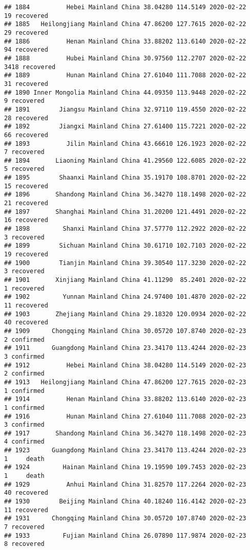 \documentclass[
]{article}
\begin{document}
\begin{verbatim}
## 1884          Hebei Mainland China 38.04280 114.5149 2020-02-22    19 recovered
## 1885   Heilongjiang Mainland China 47.86200 127.7615 2020-02-22    29 recovered
## 1886          Henan Mainland China 33.88202 113.6140 2020-02-22    94 recovered
## 1888          Hubei Mainland China 30.97560 112.2707 2020-02-22  3418 recovered
## 1889          Hunan Mainland China 27.61040 111.7088 2020-02-22    31 recovered
## 1890 Inner Mongolia Mainland China 44.09350 113.9448 2020-02-22     9 recovered
## 1891        Jiangsu Mainland China 32.97110 119.4550 2020-02-22    28 recovered
## 1892        Jiangxi Mainland China 27.61400 115.7221 2020-02-22    66 recovered
## 1893          Jilin Mainland China 43.66610 126.1923 2020-02-22     7 recovered
## 1894       Liaoning Mainland China 41.29560 122.6085 2020-02-22     5 recovered
## 1895        Shaanxi Mainland China 35.19170 108.8701 2020-02-22    15 recovered
## 1896       Shandong Mainland China 36.34270 118.1498 2020-02-22    21 recovered
## 1897       Shanghai Mainland China 31.20200 121.4491 2020-02-22    16 recovered
## 1898         Shanxi Mainland China 37.57770 112.2922 2020-02-22     3 recovered
## 1899        Sichuan Mainland China 30.61710 102.7103 2020-02-22    19 recovered
## 1900        Tianjin Mainland China 39.30540 117.3230 2020-02-22     3 recovered
## 1901       Xinjiang Mainland China 41.11290  85.2401 2020-02-22     1 recovered
## 1902         Yunnan Mainland China 24.97400 101.4870 2020-02-22    11 recovered
## 1903       Zhejiang Mainland China 29.18320 120.0934 2020-02-22    40 recovered
## 1909      Chongqing Mainland China 30.05720 107.8740 2020-02-23     2 confirmed
## 1911      Guangdong Mainland China 23.34170 113.4244 2020-02-23     3 confirmed
## 1912          Hebei Mainland China 38.04280 114.5149 2020-02-23     2 confirmed
## 1913   Heilongjiang Mainland China 47.86200 127.7615 2020-02-23     1 confirmed
## 1914          Henan Mainland China 33.88202 113.6140 2020-02-23     1 confirmed
## 1916          Hunan Mainland China 27.61040 111.7088 2020-02-23     3 confirmed
## 1917       Shandong Mainland China 36.34270 118.1498 2020-02-23     4 confirmed
## 1923      Guangdong Mainland China 23.34170 113.4244 2020-02-23     1     death
## 1924         Hainan Mainland China 19.19590 109.7453 2020-02-23     1     death
## 1929          Anhui Mainland China 31.82570 117.2264 2020-02-23    40 recovered
## 1930        Beijing Mainland China 40.18240 116.4142 2020-02-23    11 recovered
## 1931      Chongqing Mainland China 30.05720 107.8740 2020-02-23     7 recovered
## 1933         Fujian Mainland China 26.07890 117.9874 2020-02-23     8 recovered

\end{verbatim}
\end{document}
